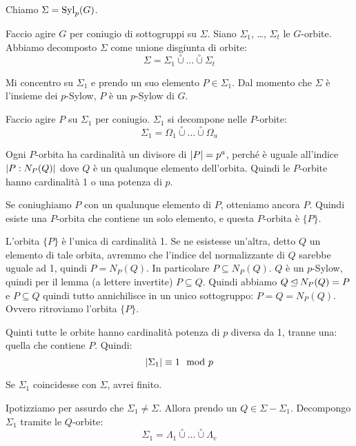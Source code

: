 \begin{dimostrazione}
    Chiamo $\Sigma = \operatorname{Syl}_p(G)$.

    Faccio agire $G$ per coniugio di sottogruppi su $\Sigma$.
    Siano $\Sigma_1$, \dots, $\Sigma_t$ le $G$-orbite.
    Abbiamo decomposto $\Sigma$ come unione disgiunta di orbite:
    \begin{equation*}
        \Sigma = \Sigma_1 \overset{\circ}{\cup} \dots \overset{\circ}{\cup} \Sigma_t
    \end{equation*}

    Mi concentro su $\Sigma_1$ e prendo un suo elemento $P \in \Sigma_1$.
    Dal momento che $\Sigma$ è l'insieme dei $p$-Sylow, $P$ è un $p$-Sylow di $G$.

    Faccio agire $P$ su $\Sigma_1$ per coniugio.
    $\Sigma_1$ si decompone nelle $P$-orbite:
    \begin{equation*}
        \Sigma_1 = \Omega_1 \overset{\circ}{\cup} \dots \overset{\circ}{\cup} \Omega_u
    \end{equation*}

    Ogni $P$-orbita ha cardinalità un divisore di $\lvert P \rvert = p^a$, perché è uguale all'indice $\lvert P:N_P(Q) \rvert$
    dove $Q$ è un qualunque elemento dell'orbita.
    Quindi le $P$-orbite hanno cardinalità 1 o una potenza di $p$.

    Se coniughiamo $P$ con un qualunque elemento di $P$, otteniamo ancora $P$.
    Quindi esiste una $P$-orbita che contiene un solo elemento, e questa $P$-orbita è $\{P\}$.

    L'orbita $\{P\}$ è l'unica di cardinalità 1.
    Se ne esistesse un'altra, detto $Q$ un elemento di tale orbita, avremmo che l'indice del normalizzante di $Q$
    sarebbe uguale ad 1, quindi $P = N_P(Q)$.
    In particolare $P \subseteq N_P(Q)$.
    $Q$ è un $p$-Sylow, quindi per il lemma (a lettere invertite) $P \subseteq Q$.
    Quindi abbiamo $Q \unlhd N_P(Q) = P$ e $P \subseteq Q$ quindi tutto annichilisce in un unico sottogruppo:
    $P = Q = N_P(Q)$.
    Ovvero ritroviamo l'orbita $\{P\}$.

    Quinti tutte le orbite hanno cardinalità potenza di $p$ diversa da 1, tranne una: quella che contiene $P$.
    Quindi:
    \begin{equation*}
        \lvert \Sigma_1 \rvert \equiv 1 \mod p
    \end{equation*}

    Se $\Sigma_1$ coincidesse con $\Sigma$, avrei finito.

    Ipotizziamo per assurdo che $\Sigma_1 \ne \Sigma$.
    Allora prendo un $Q \in \Sigma - \Sigma_1$.
    Decompongo $\Sigma_1$ tramite le $Q$-orbite:
    \begin{equation*}
        \Sigma_1 = \Lambda_1 \overset{\circ}{\cup} \dots \overset{\circ}{\cup} \Lambda_v
    \end{equation*}


\end{dimostrazione}
